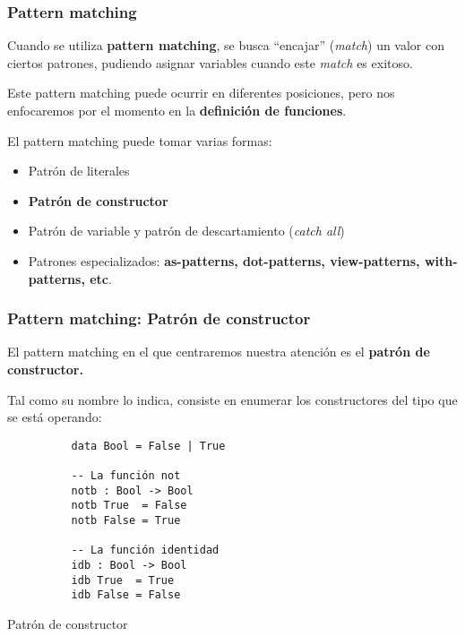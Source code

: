 \documentclass{beamer}
\begin{document}
\begin{frame}[fragile]
  \frametitle{Pattern matching}

  Cuando se utiliza \textbf{pattern matching}, se busca ``encajar'' (\emph{match}) un
  valor con ciertos patrones, pudiendo asignar variables cuando este \emph{match}
  es exitoso.

  Este pattern matching puede ocurrir en diferentes posiciones, pero nos enfocaremos por
  el momento en la \textbf{definición de funciones}.

  El pattern matching puede tomar varias formas:
  \begin{itemize}
    \item Patrón de literales
    \item \textbf{Patrón de constructor}
    \item Patrón de variable y patrón de descartamiento (\emph{catch all})
    \item Patrones especializados: \textbf{as-patterns, dot-patterns, view-patterns,
      with-patterns, etc}.
  \end{itemize}

\end{frame}

\begin{frame}[fragile]
  \frametitle{Pattern matching: Patrón de constructor}

  El pattern matching en el que centraremos nuestra atención es el
  \textbf{patrón de constructor.}

  Tal como su nombre lo indica, consiste en enumerar los constructores del tipo
  que se está operando:

  \begin{listing}[H]
    \begin{center}
      \begin{minipage}{0.42\textwidth}
          \begin{verbatim}
          data Bool = False | True

          -- La función not
          notb : Bool -> Bool
          notb True  = False
          notb False = True

          -- La función identidad
          idb : Bool -> Bool
          idb True  = True
          idb False = False
          \end{verbatim}
      \end{minipage}
    \end{center}
    \caption{Patrón de constructor}
    \label{lst:matchconstructor}
  \end{listing}

\end{frame}
\end{document}
